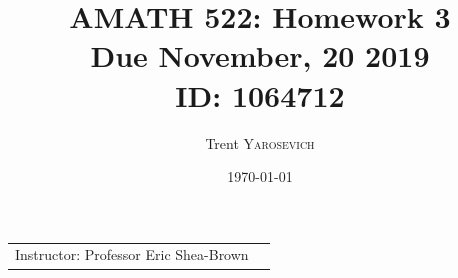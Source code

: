 \documentclass{article}
\title{AMATH 522: Homework 3 \\Due November, 20 2019 \\ ID: 1064712} %
\author{Trent \textsc{Yarosevich}} %
\date{\today} %
\begin{document}
\maketitle %
\setlength\parindent{1cm}

\begin{center}
\begin{tabular}{l r}
Instructor: Professor Eric Shea-Brown %
\end{tabular}
\end{center}
\doublespacing

\end{document}
